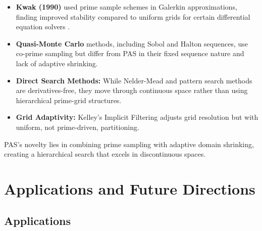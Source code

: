 \documentclass[10pt,twocolumn,letterpaper]{article}
\begin{document}
\begin{itemize}
    \item \textbf{Kwak (1990)} used prime sample schemes in Galerkin approximations, finding improved stability compared to uniform grids for certain differential equation solvers \cite{kwak1990}.
    
    \item \textbf{Quasi-Monte Carlo} methods, including Sobol \cite{sobol1967} and Halton \cite{halton1960} sequences, use co-prime sampling but differ from PAS in their fixed sequence nature and lack of adaptive shrinking.
    
    \item \textbf{Direct Search Methods:} While Nelder-Mead and pattern search methods \cite{nocedal2006} are derivatives-free, they move through continuous space rather than using hierarchical prime-grid structures.
    
    \item \textbf{Grid Adaptivity:} Kelley's Implicit Filtering \cite{kelley1999} adjusts grid resolution but with uniform, not prime-driven, partitioning.
\end{itemize}

PAS's novelty lies in combining prime sampling with adaptive domain shrinking, creating a hierarchical search that excels in discontinuous spaces.

\section{Applications and Future Directions}

\subsection{Applications}
\end{document}
